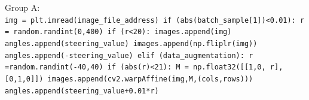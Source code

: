 \documentclass[12pt,a4paper]{article}
\begin{document}
	
		\noindent Group A:\\
		\texttt{img = plt.imread(image\_file\_address) \newline
		if (abs(batch\_sample[1])<0.01):\newline
		\hspace*{0.5cm} r = random.randint(0,400)\newline
		\hspace*{0.5cm} if (r<20):\newline
		\hspace*{1.0cm} images.append(img)\newline
		\hspace*{1.0cm} angles.append(steering\_value)\newline
		\hspace*{1.0cm} images.append(np.fliplr(img))\newline
		\hspace*{1.0cm} angles.append(-steering\_value)\newline
		\hspace*{0.5cm} elif (data\_augmentation):\newline
		\hspace*{1.0cm} r =random.randint(-40,40)\newline
		\hspace*{1.0cm} if (abs(r)<21):\newline
		\hspace*{1.5cm} M = np.float32([[1,0, r],[0,1,0]])\newline
		\hspace*{1.5cm}  images.append(cv2.warpAffine(img,M,(cols,rows)))\newline
		\hspace*{1.5cm} angles.append(steering\_value+0.01*r)}
\end{document}
